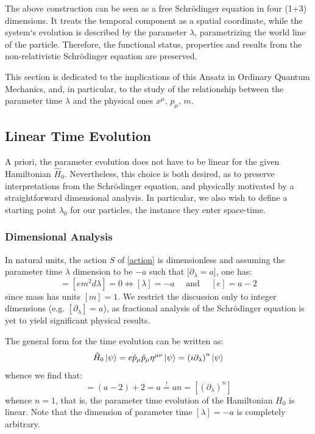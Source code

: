 \documentclass[twoside,a4paper,11pt]{article}
\numberwithin{equation}{section}
\begin{document}
The above construction can be seen as a free Schr{\"o}dinger equation in four (1+3) dimensions. It treats the temporal component as a spatial coordinate, while the system`s evolution is described by the parameter $\lambda$, parametrizing the world line of the particle. Therefore, the functional status, properties and results from the non-relativistic Schr{\"o}dinger equation are preserved. 

This section is dedicated to the implications of this Ansatz in Ordinary Quantum Mechanics, and, in particular, to the study of the relationship between the parameter time $\lambda$ and the physical ones $x^\mu$, $p_\mu$, $m$.


\subsection{Linear Time Evolution}
A priori, the parameter evolution does not have to be linear for the given Hamiltonian $\hat{H}_0$. Nevertheless, this choice is both desired, as to preserve interpretations from the Schr{\"o}dinger equation, and physically motivated by a straightforward dimensional analysis. In particular, we also wish to define a starting point $\lambda_0$ for our particles, the instance they enter space-time.


\subsubsection{Dimensional Analysis}
\label{sub:dimensionalanaylisis}
In natural units, the action $S$ of \ref{action} is dimensionless and assuming the parameter time $\lambda$ dimension to be $-a$ such that $[\partial_\lambda = a$], one has:
\begin{equation}
[S] = [em^2 d\lambda] = 0 \iff [\lambda] = -a \quad \text{ and } \quad [e]= a - 2
\end{equation}
since mass has units $[m] = 1$. We restrict the discussion only to integer dimensions (e.g. $[\partial_\lambda] = a$), as fractional analysis of the Schr{\"o}dinger equation \cite{fractionalanalysis} is yet to yield significant physical results. 

The general form for the time evolution can be written as:
\begin{equation}
\hat{H}_0 \ket{\psi} = e \hat{p}_\mu \hat{p}_\mu \eta^{\mu\nu} \ket{\psi}=   \left( i \partial_\lambda \right)^n\ket{\psi}
\end{equation}
whence we find that:
\begin{equation}
[H_0] = (a-2) + 2 = a \stackrel{!}{=} an = \left[(\partial_\lambda)^n\right]
\end{equation}
whence $n=1$, that is, the parameter time evolution of the Hamiltonian $H_0$ is linear. Note that the dimension of parameter time $[\lambda] = -a$ is completely arbitrary.
\end{document}
